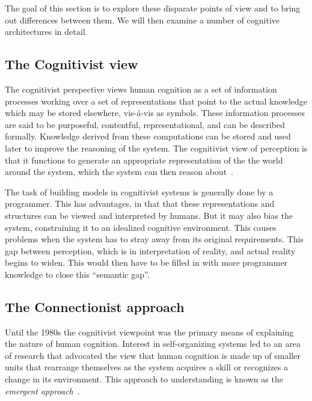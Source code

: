 The goal of this section is to explore these disparate points of view
and to bring out differences between them.  We will then examine a
number of cognitive architectures in detail.

\subsection{The Cognitivist view}
     
The cognitivist perspective views human cognition as a set of
information processes working over a set of representations that point
to the actual knowledge which may be stored elsewhere, vis-\'{a}-vis
as symbols. These information processes are said to be purposeful,
contentful, representational, and can be described
formally\cite{103009}. Knowledge derived from these computations can
be stored and used later to improve the reasoning of the system. The
cognitivist view of perception is that it functions to generate an
appropriate representation of the the world around the system, which
the system can then reason about~\cite{DBLP:journals/tec/VernonMS07}.

The task of building models in cognitivist systems is generally done
by a programmer.  This has advantages, in that that these
representations and structures can be viewed and interpreted by
humans. But it may also bias the system, constraining it to an
idealized cognitive environment.  This causes problems when the system
has to stray away from its original requirements.  This gap between
perception, which is in interpretation of reality, and actual reality
begins to widen. This would then have to be filled in with more
programmer knowledge to close this ``semantic
gap''\cite{DBLP:journals/tec/VernonMS07}.
     
\subsection{The Connectionist approach}

     Until the 1980s the cognitivist viewpoint was the primary means
     of explaining the nature of human cognition. Interest in
     self-organizing systems led to an area of research that advocated
     the view that human cognition is made up of smaller units that
     rearrange themselves as the system acquires a skill or recognizes
     a change in its environment. This approach to understanding is
     known as the \emph{emergent approach}~\cite{DBLP:journals/tec/VernonMS07}.
     
